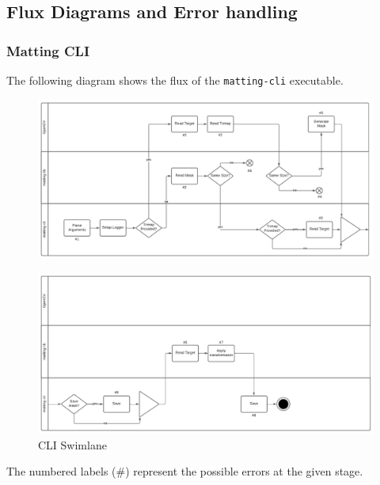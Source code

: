 \documentclass[a4paper]{article}
\begin{document}
\pagebreak

\subsection{Flux Diagrams and Error handling}

\subsubsection{Matting CLI}

The following diagram shows the flux of the \texttt{matting-cli} executable.

\begin{figure}[h]
    \includegraphics[width=\textwidth]{media/swimlane/swimlane1.pdf}
\end{figure}

\begin{figure}[h]
    \includegraphics[width=\textwidth]{media/swimlane/swimlane2.pdf}
    \caption{CLI Swimlane}
\end{figure}

The numbered labels (\#) represent the possible errors at the given stage.
\end{document}
